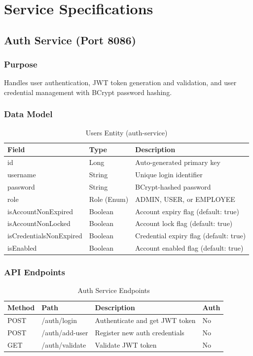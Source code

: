 \documentclass[12pt,a4paper]{report}
\begin{document}
\chapter{Service Specifications}

\section{Auth Service (Port 8086)}

\subsection{Purpose}
Handles user authentication, JWT token generation and validation, and user credential management with BCrypt password hashing.

\subsection{Data Model}

\begin{table}[H]
\centering
\caption{Users Entity (auth-service)}
\begin{tabularx}{\textwidth}{llX}
\toprule
\textbf{Field} & \textbf{Type} & \textbf{Description} \\
\midrule
id & Long & Auto-generated primary key \\
username & String & Unique login identifier \\
password & String & BCrypt-hashed password \\
role & Role (Enum) & ADMIN, USER, or EMPLOYEE \\
isAccountNonExpired & Boolean & Account expiry flag (default: true) \\
isAccountNonLocked & Boolean & Account lock flag (default: true) \\
isCredentialsNonExpired & Boolean & Credential expiry flag (default: true) \\
isEnabled & Boolean & Account enabled flag (default: true) \\
\bottomrule
\end{tabularx}
\end{table}

\subsection{API Endpoints}

\begin{table}[H]
\centering
\caption{Auth Service Endpoints}
\begin{tabularx}{\textwidth}{llXl}
\toprule
\textbf{Method} & \textbf{Path} & \textbf{Description} & \textbf{Auth} \\
\midrule
POST & /auth/login & Authenticate and get JWT token & No \\
POST & /auth/add-user & Register new auth credentials & No \\
GET & /auth/validate & Validate JWT token & No \\
\bottomrule
\end{tabularx}
\end{table}
\end{document}
